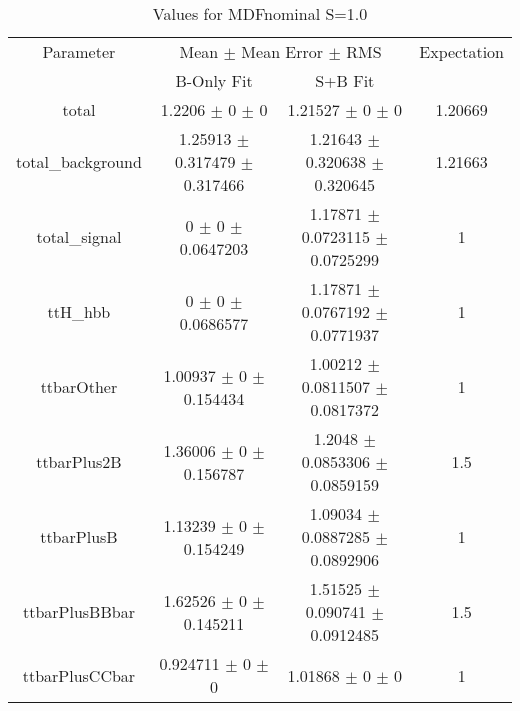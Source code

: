 \begin{table}
\centering
\caption{Values for MDFnominal S=1.0}
\begin{tabular}{cccc}
\toprule
Parameter & \multicolumn{2}{c}{Mean $\pm$ Mean Error $\pm$ RMS} & Expectation\\
 & B-Only Fit & S+B Fit & \\
\midrule
total & \num{1.2206} $\pm$ \num{0} $\pm$ \num{0} & \num{1.21527} $\pm$ \num{0} $\pm$ \num{0} & \num{1.20669}\\
total\_background & \num{1.25913} $\pm$ \num{0.317479} $\pm$ \num{0.317466} & \num{1.21643} $\pm$ \num{0.320638} $\pm$ \num{0.320645} & \num{1.21663}\\
total\_signal & \num{0} $\pm$ \num{0} $\pm$ \num{0.0647203} & \num{1.17871} $\pm$ \num{0.0723115} $\pm$ \num{0.0725299} & \num{1}\\
ttH\_hbb & \num{0} $\pm$ \num{0} $\pm$ \num{0.0686577} & \num{1.17871} $\pm$ \num{0.0767192} $\pm$ \num{0.0771937} & \num{1}\\
ttbarOther & \num{1.00937} $\pm$ \num{0} $\pm$ \num{0.154434} & \num{1.00212} $\pm$ \num{0.0811507} $\pm$ \num{0.0817372} & \num{1}\\
ttbarPlus2B & \num{1.36006} $\pm$ \num{0} $\pm$ \num{0.156787} & \num{1.2048} $\pm$ \num{0.0853306} $\pm$ \num{0.0859159} & \num{1.5}\\
ttbarPlusB & \num{1.13239} $\pm$ \num{0} $\pm$ \num{0.154249} & \num{1.09034} $\pm$ \num{0.0887285} $\pm$ \num{0.0892906} & \num{1}\\
ttbarPlusBBbar & \num{1.62526} $\pm$ \num{0} $\pm$ \num{0.145211} & \num{1.51525} $\pm$ \num{0.090741} $\pm$ \num{0.0912485} & \num{1.5}\\
ttbarPlusCCbar & \num{0.924711} $\pm$ \num{0} $\pm$ \num{0} & \num{1.01868} $\pm$ \num{0} $\pm$ \num{0} & \num{1}\\
\bottomrule
\end{tabular}
\end{table}